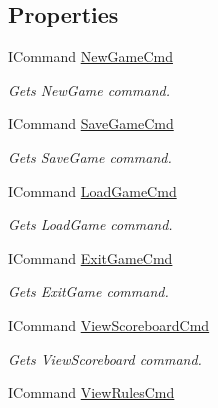 \subsection*{Properties}
\begin{DoxyCompactItemize}
\item 
I\+Command \mbox{\hyperlink{class_game_1_1_menu_view_model_ad18e8a33db6aedb19e5e545f592d7592}{New\+Game\+Cmd}}
\begin{DoxyCompactList}\small\item\em Gets New\+Game command. \end{DoxyCompactList}\item 
I\+Command \mbox{\hyperlink{class_game_1_1_menu_view_model_a59cf37e6ca5d49c2c8c81ef87efebd61}{Save\+Game\+Cmd}}
\begin{DoxyCompactList}\small\item\em Gets Save\+Game command. \end{DoxyCompactList}\item 
I\+Command \mbox{\hyperlink{class_game_1_1_menu_view_model_a0d55b1df7adf60849294957e450d0600}{Load\+Game\+Cmd}}
\begin{DoxyCompactList}\small\item\em Gets Load\+Game command. \end{DoxyCompactList}\item 
I\+Command \mbox{\hyperlink{class_game_1_1_menu_view_model_a9d35d5c808f40841e1820dca05294d35}{Exit\+Game\+Cmd}}
\begin{DoxyCompactList}\small\item\em Gets Exit\+Game command. \end{DoxyCompactList}\item 
I\+Command \mbox{\hyperlink{class_game_1_1_menu_view_model_ab3871a0b95d7e3006da23bf668e28e86}{View\+Scoreboard\+Cmd}}
\begin{DoxyCompactList}\small\item\em Gets View\+Scoreboard command. \end{DoxyCompactList}\item 
I\+Command \mbox{\hyperlink{class_game_1_1_menu_view_model_ae81d4a3f09047a1722bc997a25bc5972}{View\+Rules\+Cmd}}

\end{DoxyCompactItemize}
